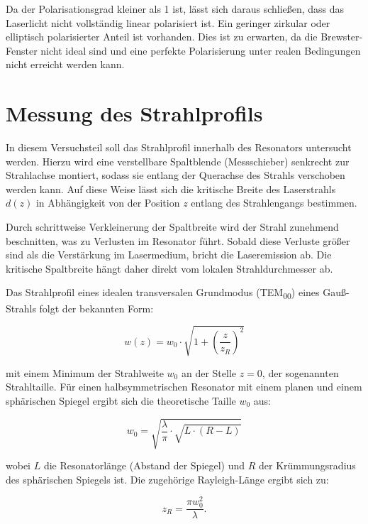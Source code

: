 Da der Polarisationsgrad kleiner als 1 ist, lässt sich daraus schließen, dass das Laserlicht nicht vollständig linear polarisiert ist. 
Ein geringer zirkular oder elliptisch polarisierter Anteil ist vorhanden. 
Dies ist zu erwarten, da die Brewster-Fenster nicht ideal sind und eine perfekte Polarisierung unter realen Bedingungen nicht erreicht werden kann.

\chapter{Messung des Strahlprofils}

In diesem Versuchsteil soll das Strahlprofil innerhalb des Resonators untersucht werden. 
Hierzu wird eine verstellbare Spaltblende (Messschieber) senkrecht zur Strahlachse montiert, sodass sie entlang der Querachse des Strahls verschoben werden kann. 
Auf diese Weise lässt sich die kritische Breite des Laserstrahls \( d(z) \) in Abhängigkeit von der Position \( z \) entlang des Strahlengangs bestimmen.

Durch schrittweise Verkleinerung der Spaltbreite wird der Strahl zunehmend beschnitten, was zu Verlusten im Resonator führt. 
Sobald diese Verluste größer sind als die Verstärkung im Lasermedium, bricht die Laseremission ab. 
Die kritische Spaltbreite hängt daher direkt vom lokalen Strahldurchmesser ab.

Das Strahlprofil eines idealen transversalen Grundmodus (TEM\textsubscript{00}) eines Gauß-Strahls folgt der bekannten Form:

\begin{equation*}
    w(z) = w_0 \cdot \sqrt{1+\left(\frac{z}{z_R}\right)^2}
\end{equation*}
 
mit einem Minimum der Strahlweite \( w_0 \) an der Stelle \( z = 0 \), der sogenannten Strahltaille. Für einen halbsymmetrischen Resonator mit einem planen und einem sphärischen Spiegel ergibt sich die theoretische Taille \( w_0 \) aus:

\begin{equation*}
    w_0 = \sqrt{\frac{\lambda}{\pi} \cdot \sqrt{L \cdot (R - L)}}
\end{equation*}

wobei \( L \) die Resonatorlänge (Abstand der Spiegel) und \( R \) der Krümmungsradius des sphärischen Spiegels ist. Die zugehörige Rayleigh-Länge ergibt sich zu:

\begin{equation*}
    z_R = \frac{\pi w_0^2}{\lambda}.
\end{equation*}


